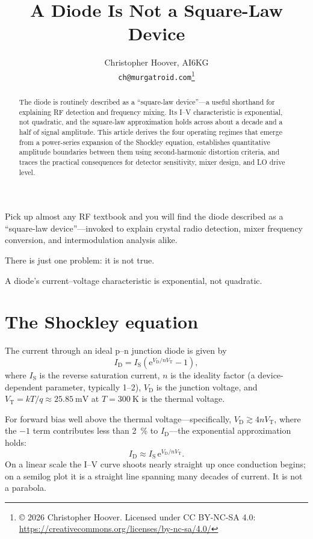\documentclass[12pt]{article}
\title{A Diode Is Not a Square-Law Device}
\author{Christopher Hoover, AI6KG \\ \texttt{ch@murgatroid.com}\thanks{\copyright{} 2026 Christopher Hoover. Licensed under CC BY-NC-SA 4.0: \url{https://creativecommons.org/licenses/by-nc-sa/4.0/}}}
\date{}
\newcommand{\ID}{I_{\mathrm{D}}}
\newcommand{\VD}{V_{\mathrm{D}}}
\newcommand{\IS}{I_{\mathrm{S}}}
\newcommand{\VT}{V_{\mathrm{T}}}
\newcommand{\eu}{\mathrm{e}}
\begin{document}
\maketitle

\begin{abstract}
The diode is routinely described as a ``square-law device''---a useful shorthand for explaining RF detection and frequency mixing. Its I--V characteristic is exponential, not quadratic, and the square-law approximation holds across about a decade and a half of signal amplitude. This article derives the four operating regimes that emerge from a power-series expansion of the Shockley equation, establishes quantitative amplitude boundaries between them using second-harmonic distortion criteria, and traces the practical consequences for detector sensitivity, mixer design, and LO drive level.
\end{abstract}

Pick up almost any RF textbook and you will find the diode described as a ``square-law device''---invoked to explain crystal radio detection, mixer frequency conversion, and intermodulation analysis alike.

There is just one problem: it is not true.

A diode's current--voltage characteristic is exponential, not quadratic.

\section*{The Shockley equation}

The current through an ideal p--n junction diode is given by \cite{sze}
\begin{equation}
\ID = \IS \left( \eu^{\VD / n \VT} - 1 \right),
\label{eq:shockley}
\end{equation}
where $\IS$ is the reverse saturation current, $n$ is the ideality factor (a device-dependent parameter, typically 1--2), $\VD$ is the junction voltage, and $\VT = kT/q \approx \SI{25.85}{\milli\volt}$ at $T = \SI{300}{\kelvin}$ is the thermal voltage.

For forward bias well above the thermal voltage---specifically, $\VD \gtrsim 4n\VT$, where the $-1$ term contributes less than \SI{2}{\percent} to $\ID$---the exponential approximation holds:
\begin{equation}
\ID \approx \IS\, \eu^{\VD / n \VT}.
\label{eq:exp-approx}
\end{equation}
On a linear scale the I--V curve shoots nearly straight up once conduction begins; on a semilog plot it is a straight line spanning many decades of current. It is not a parabola.
\end{document}
